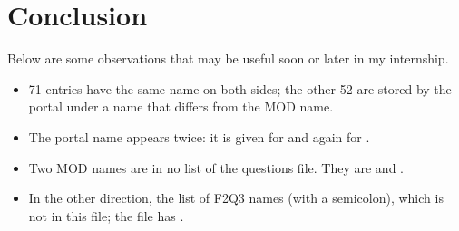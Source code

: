 \documentclass[11pt,a4paper]{article}
\begin{document}
\section{Conclusion}
Below are some observations that may be useful soon or later in my internship.

\begin{itemize}
  \item 71 entries have the same name on both sides; the other 52 are stored by the portal under
    a name that differs from the MOD name.
  \item The portal name  appears twice: it is given for  and
    again for .
  \item Two MOD names are in no list of the questions file. They are  and
    .
  \item In the other direction, the list of F2Q3 names  (with a semicolon),
    which is not in this file; the file has .
\end{itemize}



\end{document}
